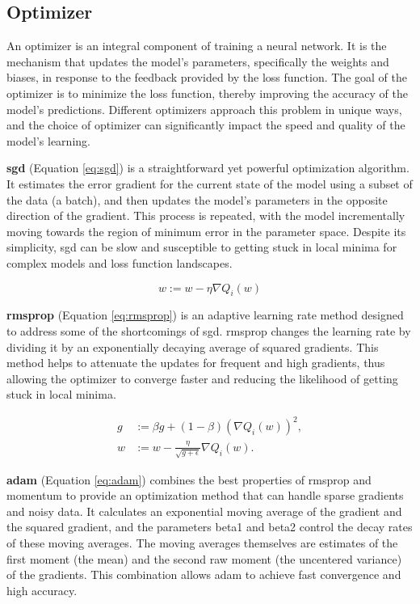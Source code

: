 \subsection{Optimizer}

An optimizer is an integral component of training a neural network. It is the
mechanism that updates the model's parameters, specifically the weights and
biases, in response to the feedback provided by the loss function. The goal of
the optimizer is to minimize the loss function, thereby improving the accuracy
of the model's predictions. Different optimizers approach this problem in
unique ways, and the choice of optimizer can significantly impact the speed and
quality of the model's learning.

\textbf{\gls{sgd}} (Equation \ref{eq:sgd}) is a straightforward yet powerful optimization algorithm.
It estimates the error gradient for the current state of the model using a subset
of the data (a batch), and then updates the model's parameters in the opposite
direction of the gradient. This process is repeated, with the model incrementally
moving towards the region of minimum error in the parameter space.
Despite its simplicity, \gls{sgd} can be slow and susceptible to getting stuck
in local minima for complex models and loss function landscapes.

\begin{equation}
	w := w - \eta\nabla Q_i(w)
	\label{eq:sgd}
\end{equation}

\textbf{\gls{rmsprop}} (Equation \ref{eq:rmsprop}) is an adaptive learning rate method designed to address
some of the shortcomings of \gls{sgd}. \gls{rmsprop} changes the learning rate
by dividing it by an exponentially decaying average of squared gradients. This
method helps to attenuate the updates for frequent and high gradients, thus
allowing the optimizer to converge faster and reducing the likelihood of getting
stuck in local minima.

\begin{equation}
	\begin{aligned}
		g & := \beta g + (1 - \beta) (\nabla Q_i(w))^2,            \\
		w & := w - \frac{\eta}{\sqrt{g + \epsilon}} \nabla Q_i(w).
	\end{aligned}
	\label{eq:rmsprop}
\end{equation}

\textbf{\gls{adam}} (Equation \ref{eq:adam}) combines the best properties of \gls{rmsprop} and momentum
to provide an optimization method that can handle sparse gradients and noisy
data. It calculates an exponential moving average of the gradient and the
squared gradient, and the parameters beta1 and beta2 control the decay rates
of these moving averages. The moving averages themselves are estimates of the
first moment (the mean) and the second raw moment (the uncentered variance) of
the gradients. This combination allows \gls{adam} to achieve fast convergence
and high accuracy.

